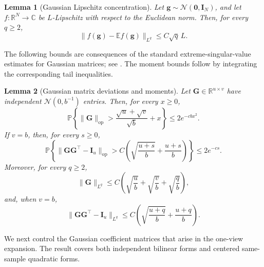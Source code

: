 \documentclass[11pt]{article}
\newtheorem{lemma}{Lemma}
\newcommand{\trans}{\top}
\begin{document}
\begin{lemma}[Gaussian Lipschitz concentration]
\label{lem:gaussian-concentration}
Let $\bm g\sim\mathcal N(\bm 0,\bm I_N)$, and let
$f:\mathbb R^N\to\mathbb C$ be $L$-Lipschitz with respect to the Euclidean
norm. Then, for every $q\ge2$,
\begin{equation}
\label{eq:gaussian-lipschitz-moment}
  \|f(\bm g)-\mathbb Ef(\bm g)\|_{L^q}
  \le C\sqrt q\,L.
\end{equation}
\end{lemma}
The following bounds are consequences of the standard extreme-singular-value
estimates for Gaussian matrices; see
\cite[Theorem~5.32 and Corollary~5.35]{vershynin2010introduction}.
The moment bounds follow by integrating the corresponding tail inequalities.

\begin{lemma}[Gaussian matrix deviations and moments]
\label{lem:gaussian-matrix-deviations}
Let $\bm G\in\mathbb R^{u\times v}$ have independent
$\mathcal N(0,b^{-1})$ entries. Then, for every $x\ge0$,
\begin{equation}
\label{eq:gaussian-matrix-op-tail}
  \mathbb P\left\{
    \|\bm G\|_{\mathrm{op}}
    >
    \frac{\sqrt u+\sqrt v}{\sqrt b}+x
  \right\}
  \le 2e^{-cbx^2}.
\end{equation}
If $v=b$, then, for every $s\ge0$,
\begin{equation}
\label{eq:gaussian-wishart-tail}
  \mathbb P\left\{
    \|\bm G\bm G^\trans-\bm I_u\|_{\mathrm{op}}
    >
    C\left(
      \sqrt{\frac{u+s}{b}}+\frac{u+s}{b}
    \right)
  \right\}
  \le 2e^{-cs}.
\end{equation}
Moreover, for every $q\ge2$,
\begin{equation}
\label{eq:gaussian-matrix-op-moment}
  \|\bm G\|_{L^q}
  \le
  C\left(
    \sqrt{\frac ub}
    +
    \sqrt{\frac vb}
    +
    \sqrt{\frac qb}
  \right),
\end{equation}
and, when $v=b$,
\begin{equation}
\label{eq:gaussian-wishart-moment}
  \|\bm G\bm G^\trans-\bm I_u\|_{L^q}
  \le
  C\left(
    \sqrt{\frac{u+q}{b}}+\frac{u+q}{b}
  \right).
\end{equation}
\end{lemma}

We next control the Gaussian coefficient matrices that arise in the one-view
expansion. The result covers both independent bilinear forms and centered
same-sample quadratic forms.
\end{document}
